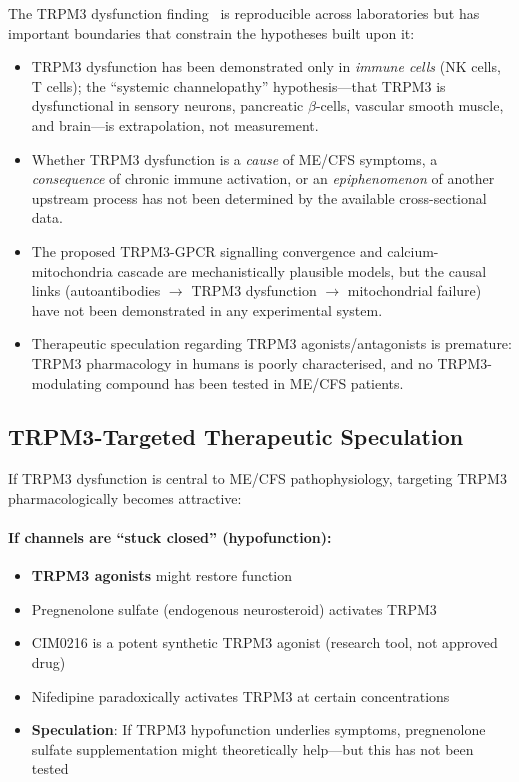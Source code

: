 \begin{limitation}
The TRPM3 dysfunction finding~\cite{Sasso2026trpm3} is reproducible across laboratories but has important boundaries that constrain the hypotheses built upon it:
\begin{itemize}
    \item TRPM3 dysfunction has been demonstrated only in \emph{immune cells} (NK cells, T cells); the ``systemic channelopathy'' hypothesis---that TRPM3 is dysfunctional in sensory neurons, pancreatic $\beta$-cells, vascular smooth muscle, and brain---is extrapolation, not measurement.
    \item Whether TRPM3 dysfunction is a \emph{cause} of ME/CFS symptoms, a \emph{consequence} of chronic immune activation, or an \emph{epiphenomenon} of another upstream process has not been determined by the available cross-sectional data.
    \item The proposed TRPM3-GPCR signalling convergence and calcium-mitochondria cascade are mechanistically plausible models, but the causal links (autoantibodies $\to$ TRPM3 dysfunction $\to$ mitochondrial failure) have not been demonstrated in any experimental system.
    \item Therapeutic speculation regarding TRPM3 agonists/antagonists is premature: TRPM3 pharmacology in humans is poorly characterised, and no TRPM3-modulating compound has been tested in ME/CFS patients.
\end{itemize}
\end{limitation}

\subsection{TRPM3-Targeted Therapeutic Speculation}

If TRPM3 dysfunction is central to ME/CFS pathophysiology, targeting TRPM3 pharmacologically becomes attractive:

\paragraph{If channels are ``stuck closed'' (hypofunction):}
\begin{itemize}
    \item \textbf{TRPM3 agonists} might restore function
    \item Pregnenolone sulfate (endogenous neurosteroid) activates TRPM3
    \item CIM0216 is a potent synthetic TRPM3 agonist (research tool, not approved drug)
    \item Nifedipine paradoxically activates TRPM3 at certain concentrations
    \item \textbf{Speculation}: If TRPM3 hypofunction underlies symptoms, pregnenolone sulfate supplementation might theoretically help---but this has not been tested
\end{itemize}


